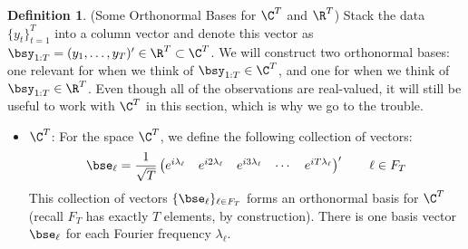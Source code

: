 \documentclass[12pt]{article}
\theoremstyle{plain}
\theoremstyle{definition}
\newtheorem{defn}[thm]{Definition}
\theoremstyle{remark}
\newcommand{\tT}{_{t=1}^T}
\begin{document}
\begin{defn}(Some Orthonormal Bases for $\C^T$ and $\R^T$)
\label{defn:periobasis}
Stack the data $\{y_t\}\tT$ into a column vector and denote this vector
as $\bsy_{1:T}=(y_1,\ldots,y_T)'\in\R^T\subset\C^T$.  We will construct
two orthonormal bases: one relevant for when we think of
$\bsy_{1:T}\in\C^T$, and one for when we think of $\bsy_{1:T}\in\R^T$.
Even though all of the observations are real-valued, it will still be
useful to work with $\C^T$ in this section, which is why we go to the
trouble.
\begin{itemize}
  \item $\C^T$:
    For the space $\C^T$, we define the following collection of vectors:
    \begin{align*}
      \bse_\ell = \frac{1}{\sqrt{T}}
      \begin{pmatrix}
        e^{i\lambda_\ell} &
        e^{i2\lambda_\ell} &
        e^{i3\lambda_\ell} &
        \cdots &
        e^{iT\lambda_\ell}
      \end{pmatrix}'
      \qquad \ell \in F_T
    \end{align*}
    This collection of vectors $\{\bse_\ell\}_{\ell\in F_T}$ forms an
    orthonormal basis for $\C^T$ (recall $F_T$ has exactly $T$ elements,
    by construction). There is one basis vector $\bse_\ell$ for each
    Fourier frequency $\lambda_\ell$.


\end{itemize}
\end{defn}
\end{document}
